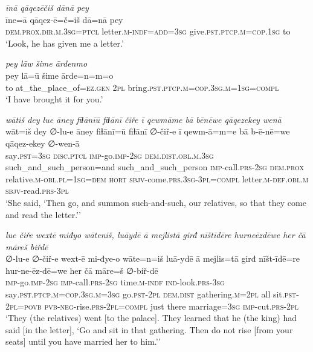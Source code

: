 \ea \label{KŠ.84}
\textit{īnā qāqezēčiš dānā pey} \\ 
\gll īne=ā qāqez-ē=č=iš dā=nā pey \\ 
 \textsc{dem.prox}\textsc{.dir}\textsc{.m}\textsc{.3sg}=\textsc{ptcl} letter\textsc{.m}\textsc{-indf}\textsc{=add}\textsc{=3sg} give\textsc{.pst}\textsc{.ptcp}\textsc{.m}\textsc{=cop}\textsc{.\textsc{1sg}} to \\ 
\glt `Look, he has given me a letter.'
\z 
 
\ea \label{KŠ.85}
\textit{pey lāw šime ārdenmo} \\ 
\gll pey lā=ū šime ārde=n=m=o \\ 
 to at\_the\_place\_of\textsc{\textsc{=ez.gen}} \textsc{2pl} bring\textsc{.pst}\textsc{.ptcp}\textsc{.m}\textsc{=cop}\textsc{.3sg}\textsc{.m}\textsc{=\textsc{1sg}}\textsc{=compl} \\ 
\glt `I have brought it for you.'
\z 
 
\ea \label{KŠ.86}
\textit{wātiš dey lue āney fiɫānīū fiɫānī čiře ī qewmāme bā bēnēwe qāqezekey wenā} \\ 
\gll wāt=iš dey ∅-lu-e āney fiɫānī=ū fiɫānī ∅-čiř-e ī qewm-ā=m=e bā b-ē-nē=we qāqez-ekey ∅-wen-ā \\ 
 say\textsc{.pst}\textsc{=3sg} \textsc{disc.ptcl} \textsc{imp-}go.\textsc{imp-}\textsc{2sg} \textsc{dem.dist}\textsc{.obl}\textsc{.m}\textsc{.3sg} such\_and\_such\_person=and such\_and\_such\_person \textsc{imp-}call\textsc{.prs}-\textsc{2sg} \textsc{dem.prox} relative\textsc{.m}\textsc{-obl}\textsc{.pl}\textsc{=\textsc{1sg}}\textsc{=dem} \textsc{hort} \textsc{sbjv-}come\textsc{.prs}\textsc{.3sg}\textsc{-3pl}\textsc{=compl} letter\textsc{.m}\textsc{-def}\textsc{.obl}\textsc{.m} \textsc{sbjv-}read\textsc{.prs}\textsc{-3pl} \\ 
\glt `She said, ‘Then go, and summon such-and-such, our relatives, so that they come and read the letter.’'
\z 
 
\ea \label{KŠ.87}
\textit{lue čiře wextē miđyo wāteniš, luāydē ā mejlistā girđ nīštīdēre hurneēzdēwe her čā māreš biřdē} \\ 
\gll ∅-lu-e ∅-čiř-e wext-ē mi-đye-o wāte=n=iš luā-ydē ā mejlis=tā girđ nīšt-īdē=re hur-ne-ēz-dē=we her čā māre=š ∅-biř-dē \\ 
 \textsc{imp-}go.\textsc{imp-}\textsc{2sg} \textsc{imp-}call\textsc{.prs}-\textsc{2sg} time\textsc{.m}\textsc{-indf} \textsc{ind-}look\textsc{.prs}\textsc{-3sg} say\textsc{.pst}\textsc{.ptcp}\textsc{.m}\textsc{=cop}\textsc{.3sg}\textsc{.m}\textsc{=3sg} go\textsc{.pst}-\textsc{2pl} \textsc{dem.dist} gathering\textsc{.m}=\textsc{2pl} all sit\textsc{.pst}-\textsc{2pl}\textsc{=\textsc{povb}} \textsc{pvb-}\textsc{neg-}rise\textsc{.prs}-\textsc{2pl}\textsc{=compl} just there marriage\textsc{=3sg} \textsc{imp-}cut\textsc{.prs}-\textsc{2pl} \\ 
\glt `They (the relatives) went [to the palace]. They learned that he (the king) had said [in the letter], ‘Go and sit in that gathering. Then do not rise [from your seats] until you have married her to him.’'
\z 
 

